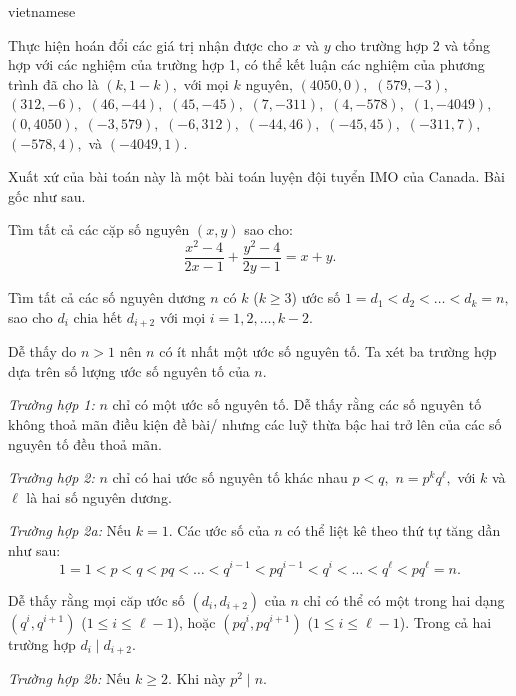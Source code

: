 \documentclass{article}
\begin{document}
\begin{otherlanguage*}{vietnamese}
\begin{soln}
    Thực hiện hoán đổi các giá trị nhận được cho $x$ và $y$ cho trường hợp 2 và tổng hợp với các nghiệm của trường hợp 1,
    có thể kết luận các nghiệm của phương trình đã cho là $(k, 1-k),$ với mọi $k$ nguyên, $(4050, 0),$ $(579, -3),$ $(312, -6),$
    $(46, -44),$ $(45, -45),$ $(7, -311),$ $(4, -578),$ $(1, -4049),$ $(0, 4050),$ $(-3, 579),$ $(-6, 312),$
    $(-44, 46),$ $(-45, 45),$ $(-311, 7),$ $(-578, 4),$ và $(-4049, 1).$
\end{soln}

\begin{remark*}
    Xuất xứ của bài toán này là một bài toán luyện đội tuyển IMO của Canada. Bài gốc như sau.

    \bigbreak
    Tìm tất cả các cặp số nguyên $(x, y)$ sao cho:
    \[
        \frac{x^2 - 4}{2x - 1} + \frac{y^2 - 4}{2y - 1} = x + y.
    \]
\end{remark*}

\newpage

\begin{problem*}
    Tìm tất cả các số nguyên dương $n$ có $k$ ($k \ge 3$) ước số $1 = d_1 < d_2 < \ldots < d_k = n,$
    sao cho $d_i$ chia hết $d_{i+2}$ với mọi $i=1,2, \ldots, k-2.$
\end{problem*}

\begin{soln}
    Dễ thấy do $n>1$ nên $n$ có ít nhất một ước số nguyên tố. Ta xét ba trường hợp dựa trên số lượng ước số nguyên tố của $n$.

    \textit{Trường hợp 1:} $n$ chỉ có một ước số nguyên tố.
    Dễ thấy rằng các số nguyên tố không thoả mãn điều kiện đề bài/ nhưng các luỹ thừa bậc hai trở lên của các số nguyên tố đều thoả mãn.

    \textit{Trường hợp 2:} $n$ chỉ có hai ước số nguyên tố khác nhau $p<q,$ $n=p^k q^{\ell},$ với $k$ và $\ell$ là hai số nguyên dương.

    \textit{Trường hợp 2a:} Nếu $k=1.$ Các ước số của $n$ có thể liệt kê theo thứ tự tăng dần như sau:
    \[
        1 = 1 < p < q < pq < \ldots < q^{i-1} < pq^{i-1} < q^{i} < \ldots < q^{\ell} < pq^{\ell} = n.
    \]

    Dễ thấy rằng mọi căp ước số $(d_i, d_{i+2})$ của $n$ chỉ có thể có một trong hai dạng $(q^{i}, q^{i+1})$ ($1 \le i \le \ell-1$), hoặc $(pq^{i}, pq^{i+1})$ ($1 \le i \le \ell-1$).
    Trong cả hai trường hợp $d_i \mid d_{i+2}.$

    \textit{Trường hợp 2b:} Nếu $k \ge 2.$ Khi này $p^2 \mid n.$ 
    

\end{soln}
\end{otherlanguage*}
\end{document}
